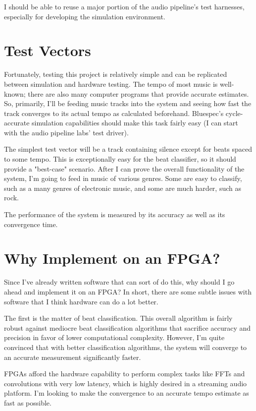 \documentclass[letterpaper]{article}
\begin{document}
    I should be able to reuse a major portion of the audio pipeline's test
    harnesses, especially for developing the simulation environment.


\section{Test Vectors}

    Fortunately, testing this project is relatively simple and can be
    replicated between simulation and hardware testing.  The tempo of most
    music is well-known; there are also many computer programs that provide
    accurate estimates.  So, primarily, I'll be feeding music tracks into the
    system and seeing how fast the track converges to its actual tempo as
    calculated beforehand.  Bluespec's cycle-accurate simulation capabilities
    should make this task fairly easy (I can start with the audio pipeline
    labs' test driver).

    The simplest test vector will be a track containing silence except for
    beats spaced to some tempo.  This is exceptionally easy for the beat
    classifier, so it should provide a "best-case" scenario.  After I can prove
    the overall functionality of the system, I'm going to feed in music of
    various genres.  Some are easy to classify, such as a many genres of
    electronic music, and some are much harder, such as rock.

    The performance of the system is measured by its accuracy as well as its
    convergence time.


\section{Why Implement on an FPGA?}

    Since I've already written software that can sort of do this, why should I
    go ahead and implement it on an FPGA?  In short, there are some subtle
    issues with software that I think hardware can do a lot better.

    The first is the matter of beat classification.  This overall algorithm is
    fairly robust against mediocre beat classification algorithms that
    sacrifice accuracy and precision in favor of lower computational
    complexity.  However, I'm quite convinced that with better classification
    algorithms, the system will converge to an accurate measurement
    significantly faster.

    FPGAs afford the hardware capability to perform complex tasks like FFTs and
    convolutions with very low latency, which is highly desired in a streaming
    audio platform.  I'm looking to make the convergence to an accurate tempo
    estimate as fast as possible. 
\end{document}
